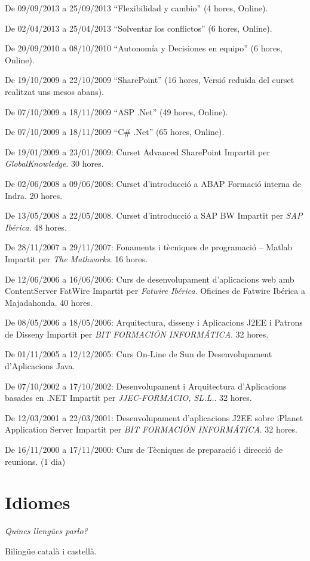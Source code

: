 \documentclass[11pt]{article}
\begin{document}
De 09/09/2013 a 25/09/2013 ``Flexibilidad y cambio'' (4 hores, Online).

De 02/04/2013 a 25/04/2013 ``Solventar los conflictos'' (6 hores, Online).

De 20/09/2010 a 08/10/2010 ``Autonomía y Decisiones en equipo'' (6 hores, Online).

De 19/10/2009 a 22/10/2009 ``SharePoint'' (16 hores, Versió reduïda del curset realitzat uns mesos abans).

De 07/10/2009 a 18/11/2009 ``ASP .Net'' (49 hores, Online).

De 07/10/2009 a 18/11/2009 ``C\# .Net'' (65 hores, Online).

De 19/01/2009 a 23/01/2009: Curset Advanced SharePoint
Impartit per \emph{GlobalKnowledge}. 30 hores.

De 02/06/2008 a 09/06/2008: Curset d’introducció a ABAP
Formació interna de Indra. 20 hores.

De 13/05/2008 a 22/05/2008. Curset d’introducció a SAP BW
Impartit per \emph{SAP Ibérica}. 48 hores.

De 28/11/2007 a 29/11/2007: Fonaments i tècniques de programació – Matlab
Impartit per \emph{The Mathworks}. 16 hores.

De 12/06/2006 a 16/06/2006: Curs de desenvolupament d’aplicacions web amb ContentServer FatWire
Impartit per \emph{Fatwire Ibérica}. Oficines de Fatwire Ibérica a Majadahonda. 40 hores.

De 08/05/2006 a 18/05/2006: Arquitectura, disseny i Aplicacions J2EE i Patrons de Disseny
Impartit per \emph{BIT FORMACIÓN INFORMÁTICA}. 32 hores.

De 01/11/2005 a 12/12/2005: Curs On-Line de Sun de Desenvolupament d'Aplicacions Java.

De 07/10/2002 a 17/10/2002: Desenvolupament i Arquitectura d’Aplicacions basades en .NET
Impartit per \emph{JJEC-FORMACIO, SL.L.}. 32 hores.

De 12/03/2001 a 22/03/2001: Desenvolupament d’aplicacions J2EE sobre iPlanet Application Server
Impartit per \emph{BIT FORMACIÓN INFORMÁTICA}. 32 hores.

De 16/11/2000 a 17/11/2000: Curs de Tècniques de preparació i direcció de reunions. (1 dia)
\section{Idiomes}
\label{sec-4}

\emph{Quines llengües parlo?}

Bilingüe català i castellà.
\end{document}
